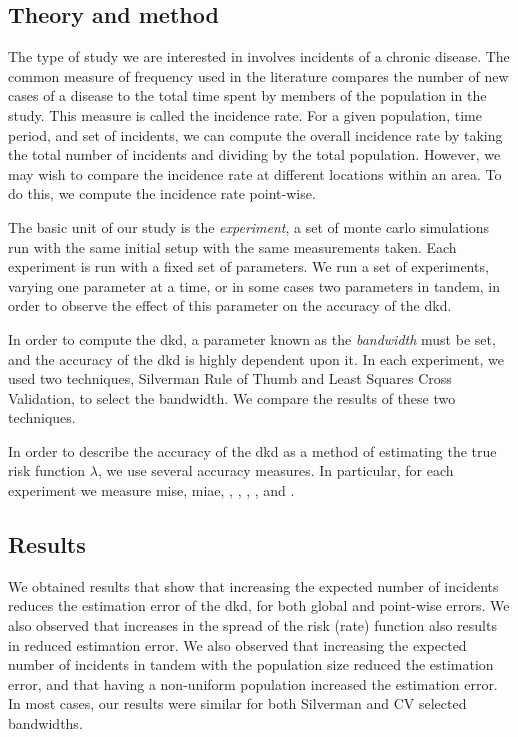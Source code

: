 \begin{onehalfspace}
\subsection*{Theory and method}

The type of study we are interested in involves incidents of a chronic disease.
The common measure of frequency used in the literature compares the number of new cases of a disease to the total time spent by members of the population in the study.
This measure is called the incidence rate.
For a given population, time period, and set of incidents,
we can compute the overall incidence rate by taking the total number of incidents and dividing by the total population.
However, we may wish to compare the incidence rate at different locations within an area.
To do this, we compute the incidence rate point-wise.

The basic unit of our study is the \textit{experiment},
a set of monte carlo simulations run with the same initial setup with the same measurements taken.
Each experiment is run with a fixed set of parameters.
We run a set of experiments,
varying one parameter at a time, or in some cases two parameters in tandem,
in order to observe the effect of this parameter on the accuracy of the \acrshort{dkd}.

In order to compute the \acrshort{dkd},
a parameter known as the \textit{bandwidth} must be set,
and the accuracy of the \acrshort{dkd} is highly dependent upon it.
In each experiment,
we used two techniques,
Silverman Rule of Thumb and Least Squares Cross Validation,
to select the bandwidth.
We compare the results of these two techniques.

In order to describe the accuracy of the \acrshort{dkd} as a method of estimating the true risk function $\lambda$,
we use several accuracy measures.
In particular,
for each experiment we measure \acrfull{mise},
\acrfull{miae},
,
,
,
,
and .

\subsection*{Results}

We obtained results that show that increasing the expected number of incidents
reduces the estimation error of the \acrshort{dkd},
for both global and point-wise errors.
We also observed that increases in the spread of the risk (rate) function also results in reduced estimation error.
We also observed that increasing the expected number of incidents in tandem with the population size reduced the estimation error,
and that having a non-uniform population increased the estimation error.
In most cases,
our results were similar for both Silverman and CV selected bandwidths.


\end{onehalfspace}
